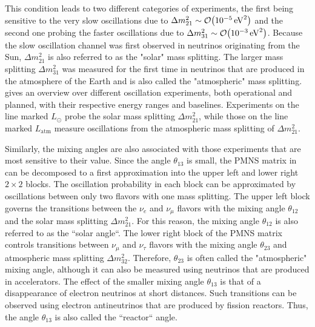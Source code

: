 This condition leads to two different categories of experiments, the first being sensitive to the very slow oscillations due to $\Delta m^2_{21}\sim\order{\SI{e-5}{eV^2}}$ and the second one probing the faster oscillations due to $\Delta m^2_{31}\sim\order{\SI{e-3}{eV^2}}$.
Because the slow oscillation channel was first observed in neutrinos originating from the Sun, $\Delta m^2_{21}$ is also referred to as the "solar" mass splitting.
The larger mass splitting $\Delta m^2_{31}$ was measured for the first time in neutrinos that are produced in the atmosphere of the Earth and is also called the "atmospheric" mass splitting.
 gives an overview over different oscillation experiments, both operational and planned, with their respective energy ranges and baselines.
Experiments on the line marked $L_{\odot}$ probe the solar mass splitting $\Delta m^2_{21}$, while those on the line marked $L_\mathrm{atm}$ measure oscillations from the atmospheric mass splitting of $\Delta m^2_{21}$.

Similarly, the mixing angles are also associated with those experiments that are most sensitive to their value.
Since the angle $\theta_{13}$ is small, the PMNS matrix in  can be decomposed to a first approximation into the upper left and lower right $2\times2$ blocks.
The oscillation probability in each block can be approximated by oscillations between only two flavors with one mass splitting.
The upper left block governs the transitions between the $\nu_e$ and $\nu_\mu$ flavors with the mixing angle $\theta_{12}$ and the solar mass splitting $\Delta m^2_{21}$.
For this reason, the mixing angle $\theta_{12}$ is also referred to as the ``solar angle``.
The lower right block of the PMNS matrix controls transitions between $\nu_\mu$ and $\nu_\tau$ flavors with the mixing angle $\theta_{23}$ and atmospheric mass splitting $\Delta m^2_{32}$.
Therefore, $\theta_{23}$ is often called the "atmospheric" mixing angle, although it can also be measured using neutrinos that are produced in accelerators.
The effect of the smaller mixing angle $\theta_{13}$ is that of a disappearance of electron neutrinos at short distances.
Such transitions can be observed using electron antineutrinos that are produced by fission reactors.
Thus, the angle $\theta_{13}$ is also called the ``reactor`` angle.


